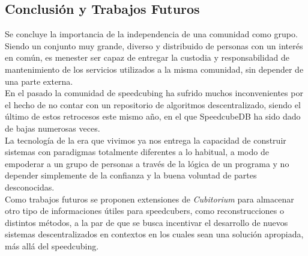 \begin{multicols}{2}
\section{Conclusión y Trabajos Futuros}

Se concluye la importancia de la independencia de una comunidad como grupo. Siendo un conjunto muy grande, diverso y distribuido de personas con un interés en común, es menester ser capaz de entregar la custodia y responsabilidad de mantenimiento de los servicios utilizados a la misma comunidad, sin depender de una parte externa.\\

En el pasado la comunidad de speedcubing ha sufrido muchos inconvenientes por el hecho de no contar con un repositorio de algoritmos descentralizado, siendo el último de estos retrocesos este mismo año, en el que SpeedcubeDB ha sido dado de bajas numerosas veces.\\

La tecnología de la era que vivimos ya nos entrega la capacidad de construir sistemas con paradigmas totalmente diferentes a lo habitual, a modo de empoderar a un grupo de personas a través de la lógica de un programa y no depender simplemente de la confianza y la buena voluntad de partes desconocidas.\\

Como trabajos futuros se proponen extensiones de \textit{Cubitorium} para almacenar otro tipo de informaciones útiles para speedcubers, como reconstrucciones o distintos métodos, a la par de que se busca incentivar el desarrollo de nuevos sistemas descentralizados en contextos en los cuales sean una solución apropiada, más allá del speedcubing.







\end{multicols}


